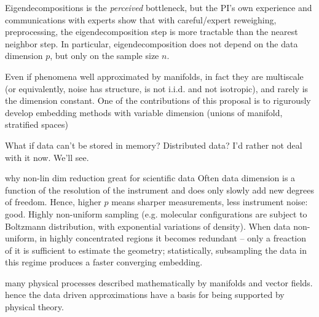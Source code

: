 \documentclass[floatfix,11pt]{revtex4-1}
\begin{document}
\item Eigendecompositions is the {\em perceived} bottleneck, but the PI's own experience and communications with experts show that with careful/expert reweighing, preprocessing, the eigendecomposition step is more tractable than the nearest neighbor step. In particular, eigendecomposition does not depend on the data dimension $p$, but only on the sample size $n$. 
\item Even if phenomena well approximated by manifolds, in fact they are multiscale (or equivalently, noise has structure, is not i.i.d. and not isotropic), and rarely is the dimension constant. One of the contributions of this proposal is to rigurously develop embedding methods with variable dimension (unions of manifold, stratified spaces)
\item What if data can't be stored in memory? Distributed data? I'd rather not deal with it now. We'll see. 

\item[why non-lin dim reduction great for scientific data] Often data dimension is a function of the resolution of the instrument and does only slowly add new degrees of freedom. Hence, higher $p$ means sharper measurements, less instrument noise: good. Highly non-uniform sampling (e.g. molecular configurations are subject to Boltzmann distribution, with exponential variations of density). When data non-uniform, in highly concentrated regions it becomes redundant -- only a freaction of it is sufficient to estimate the geometry; statistically, subsampling the data in this regime produces a faster converging embedding. 
\item many physical processes described mathematically by manifolds and vector fields. hence the data driven approximations have a basis for being supported by physical theory.
\eit
\end{document}
